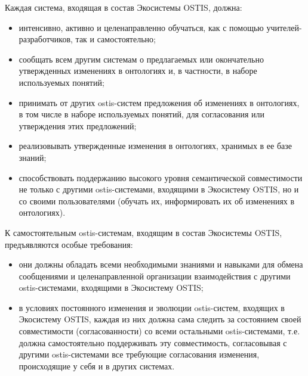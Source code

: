 Каждая система, входящая в состав Экосистемы OSTIS, должна:
\begin{itemize}
    \item{интенсивно, активно и целенаправленно обучаться, как с помощью учителей-разработчиков, так и самостоятельно;}
    \item{сообщать всем другим системам о предлагаемых или окончательно утвержденных изменениях в онтологиях и, в частности, в наборе используемых понятий;}
    \item{принимать от других ostis-систем предложения об изменениях в онтологиях, в том числе в наборе используемых понятий, для согласования или утверждения этих предложений;}
    \item{реализовывать утвержденные изменения в онтологиях, хранимых в ее базе знаний;}
    \item{способствовать поддержанию высокого уровня семантической совместимости не только с другими ostis-системами, входящими в Экосистему OSTIS, но и со своими пользователями (обучать их, информировать их об изменениях в онтологиях).}
\end{itemize}

К самостоятельным ostis-системам, входящим в состав Экосистемы OSTIS, предъявляются особые требования:
\begin{itemize}
    \item{они должны обладать всеми необходимыми знаниями и навыками для обмена сообщениями и целенаправленной организации взаимодействия с другими ostis-системами, входящими в Экосистему OSTIS;}
    \item{в условиях постоянного изменения и эволюции ostis-систем, входящих в Экосистему OSTIS, каждая из них должна сама следить за состоянием своей совместимости (согласованности) со всеми остальными ostis-системами, т.е. должна самостоятельно поддерживать эту совместимость, согласовывая с другими ostis-системами все требующие согласования изменения, происходящие у себя и в других системах.}
\end{itemize}

